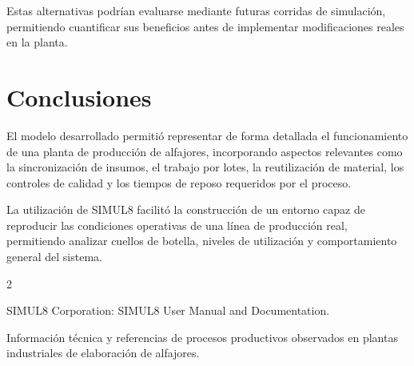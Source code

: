 \documentclass[runningheads]{llncs}
\begin{document}
Estas alternativas podrían evaluarse mediante futuras corridas de simulación, permitiendo cuantificar sus beneficios antes de implementar modificaciones reales en la planta.

\section{Conclusiones}

El modelo desarrollado permitió representar de forma detallada el funcionamiento de una planta de producción de alfajores, incorporando aspectos relevantes como la sincronización de insumos, el trabajo por lotes, la reutilización de material, los controles de calidad y los tiempos de reposo requeridos por el proceso.

La utilización de SIMUL8 facilitó la construcción de un entorno capaz de reproducir las condiciones operativas de una línea de producción real, permitiendo analizar cuellos de botella, niveles de utilización y comportamiento general del sistema.

\begin{thebibliography}{2}

SIMUL8 Corporation: SIMUL8 User Manual and Documentation.

Información técnica y referencias de procesos productivos observados en plantas industriales de elaboración de alfajores.

\end{thebibliography}
\end{document}
